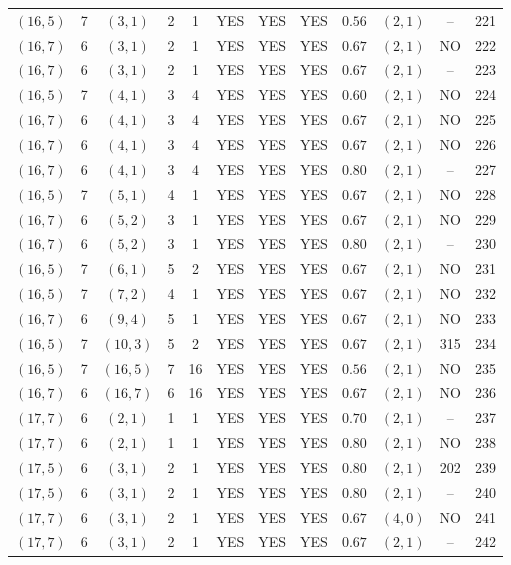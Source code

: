\begin{longtable}{|c|c|c|c|c|c|c|c|c|c|c|c|}
$(16,5)$ & 7 & $(3,1)$ & 2 & 1 & YES & YES & YES & $0.56$ & $(2,1)$ & -- & 221\\
$(16,7)$ & 6 & $(3,1)$ & 2 & 1 & YES & YES & YES & $0.67$ & $(2,1)$ & NO & 222\\
$(16,7)$ & 6 & $(3,1)$ & 2 & 1 & YES & YES & YES & $0.67$ & $(2,1)$ & -- & 223\\
$(16,5)$ & 7 & $(4,1)$ & 3 & 4 & YES & YES & YES & $0.60$ & $(2,1)$ & NO & 224\\
$(16,7)$ & 6 & $(4,1)$ & 3 & 4 & YES & YES & YES & $0.67$ & $(2,1)$ & NO & 225\\
$(16,7)$ & 6 & $(4,1)$ & 3 & 4 & YES & YES & YES & $0.67$ & $(2,1)$ & NO & 226\\
$(16,7)$ & 6 & $(4,1)$ & 3 & 4 & YES & YES & YES & $0.80$ & $(2,1)$ & -- & 227\\
$(16,5)$ & 7 & $(5,1)$ & 4 & 1 & YES & YES & YES & $0.67$ & $(2,1)$ & NO & 228\\
$(16,7)$ & 6 & $(5,2)$ & 3 & 1 & YES & YES & YES & $0.67$ & $(2,1)$ & NO & 229\\
$(16,7)$ & 6 & $(5,2)$ & 3 & 1 & YES & YES & YES & $0.80$ & $(2,1)$ & -- & 230\\
$(16,5)$ & 7 & $(6,1)$ & 5 & 2 & YES & YES & YES & $0.67$ & $(2,1)$ & NO & 231\\
$(16,5)$ & 7 & $(7,2)$ & 4 & 1 & YES & YES & YES & $0.67$ & $(2,1)$ & NO & 232\\
$(16,7)$ & 6 & $(9,4)$ & 5 & 1 & YES & YES & YES & $0.67$ & $(2,1)$ & NO & 233\\
$(16,5)$ & 7 & $(10,3)$ & 5 & 2 & YES & YES & YES & $0.67$ & $(2,1)$ & 315 & 234\\
$(16,5)$ & 7 & $(16,5)$ & 7 & 16 & YES & YES & YES & $0.56$ & $(2,1)$ & NO & 235\\
$(16,7)$ & 6 & $(16,7)$ & 6 & 16 & YES & YES & YES & $0.67$ & $(2,1)$ & NO & 236\\
$(17,7)$ & 6 & $(2,1)$ & 1 & 1 & YES & YES & YES & $0.70$ & $(2,1)$ & -- & 237\\
$(17,7)$ & 6 & $(2,1)$ & 1 & 1 & YES & YES & YES & $0.80$ & $(2,1)$ & NO & 238\\
$(17,5)$ & 6 & $(3,1)$ & 2 & 1 & YES & YES & YES & $0.80$ & $(2,1)$ & 202 & 239\\
$(17,5)$ & 6 & $(3,1)$ & 2 & 1 & YES & YES & YES & $0.80$ & $(2,1)$ & -- & 240\\
$(17,7)$ & 6 & $(3,1)$ & 2 & 1 & YES & YES & YES & $0.67$ & $(4,0)$ & NO & 241\\
$(17,7)$ & 6 & $(3,1)$ & 2 & 1 & YES & YES & YES & $0.67$ & $(2,1)$ & -- & 242\\

\end{longtable}
